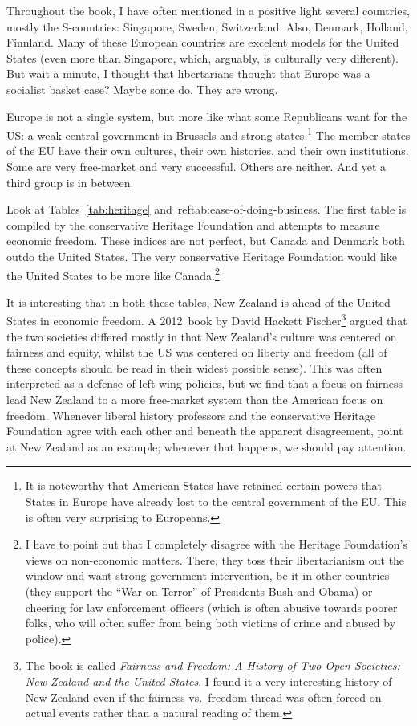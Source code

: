 Throughout the book, I have often mentioned in a positive light several
countries, mostly the S-countries: Singapore, Sweden, Switzerland. Also,
Denmark, Holland, Finnland. Many of these European countries are excelent
models for the United States (even more than Singapore, which, arguably, is
culturally very different). But wait a minute, I thought that libertarians
thought that Europe was a socialist basket case? Maybe some do. They are wrong.

Europe is not a single system, but more like what some Republicans want for the
US: a weak central government in Brussels and strong states.\footnote{It is
noteworthy that American States have retained certain powers that States in
Europe have already lost to the central government of the EU. This is often
very surprising to Europeans.} The member-states of the EU have their own
cultures, their own histories, and their own institutions. Some are very
free-market and very successful. Others are neither. And yet a third group is
in between.

Look at Tables~\ref{tab:heritage} and~ref{tab:ease-of-doing-business}. The
first table is compiled by the conservative Heritage Foundation and attempts to
measure economic freedom. These indices are not perfect, but Canada and Denmark
both outdo the United States. The very conservative Heritage Foundation would
like the United States to be more like Canada.\footnote{I have to point out
that I completely disagree with the Heritage Foundation's views on non-economic
matters. There, they toss their libertarianism out the window and want strong
government intervention, be it in other countries (they support the ``War on
Terror'' of Presidents Bush and Obama) or cheering for law enforcement officers
(which is often abusive towards poorer folks, who will often suffer from being
both victims of crime and abused by police).}

It is interesting that in both these tables, New Zealand is ahead of the United
States in economic freedom. A 2012~book by David Hackett Fischer\footnote{The
book is called \emph{Fairness and Freedom: A History of Two Open Societies: New
Zealand and the United States}. I found it a very interesting history of New
Zealand even if the fairness vs.\ freedom thread was often forced on actual
events rather than a natural reading of them.} argued that the two societies
differed mostly in that New Zealand's culture was centered on fairness and
equity, whilst the US was centered on liberty and freedom (all of these
concepts should be read in their widest possible sense). This was often
interpreted as a defense of left-wing policies, but we find that a focus on
fairness lead New Zealand to a more free-market system than the American focus
on freedom. Whenever liberal history professors and the conservative Heritage
Foundation agree with each other and beneath the apparent disagreement, point
at New Zealand as an example; whenever that happens, we should pay attention.


